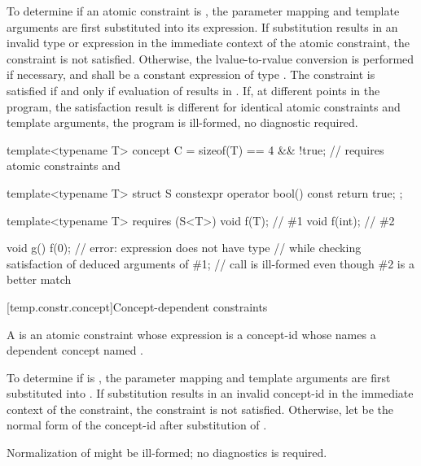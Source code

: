 \pnum
To determine if an atomic constraint is
,
the parameter mapping and template arguments are
first substituted into its expression.
If substitution results in an invalid type or expression
in the immediate context of the atomic constraint,
the constraint is not satisfied.
Otherwise, the lvalue-to-rvalue conversion
is performed if necessary,
and  shall be a constant expression of type .
The constraint is satisfied if and only if evaluation of 
results in .
If, at different points in the program, the satisfaction result is different
for identical atomic constraints and template arguments,
the program is ill-formed, no diagnostic required.
\begin{example}
\begin{codeblock}
template<typename T> concept C =
  sizeof(T) == 4 && !true;      // requires atomic constraints  and 

template<typename T> struct S {
  constexpr operator bool() const { return true; }
};

template<typename T> requires (S<T>{})
void f(T);                      // \#1
void f(int);                    // \#2

void g() {
  f(0);                         // error: expression  does not have type 
}                               // while checking satisfaction of deduced arguments of \#1;
                                // call is ill-formed even though \#2 is a better match
\end{codeblock}
\end{example}

[temp.constr.concept]{Concept-dependent constraints}

\pnum
A   is
an atomic constraint whose expression is a concept-id  whose
 names a dependent concept named .

\pnum
To determine if  is
,
the parameter mapping and template arguments are first
substituted into .
If substitution results in an invalid concept-id in
the immediate context of the constraint,
the constraint is not satisfied.
Otherwise, let  be
the normal form of the concept-id
after substitution of .
\begin{note}
Normalization of  might be ill-formed; no diagnostics is required.
\end{note}

